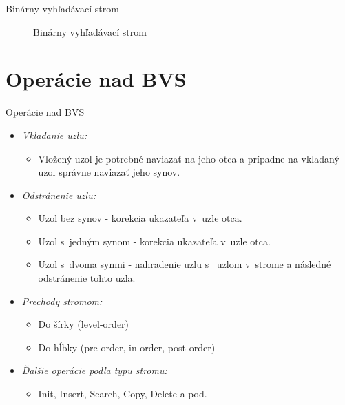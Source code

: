 \documentclass[10pt]{beamer}
\begin{document}
\begin{frame}{Binárny vyhľadávací strom}
    \begin{center}
    \begin{figure}
        \caption{Binárny vyhľadávací strom}
    \end{figure}
    \end{center}
\end{frame}

\section{Operácie nad BVS}
\begin{frame}{Operácie nad BVS}
    \begin{itemize}
        \item{\emph{Vkladanie uzlu:}}
        \begin{itemize}
            \item{Vložený uzol je potrebné naviazať na jeho otca a prípadne na vkladaný uzol správne
            naviazať jeho synov.}
            \end{itemize}
        \item{\emph{Odstránenie uzlu:}}
            \begin{itemize}
            \item{Uzol bez synov - korekcia ukazateľa v~uzle otca.}
            \item{Uzol s~jedným synom - korekcia ukazateľa v~uzle otca.}
            \item{Uzol s~dvoma synmi - nahradenie uzlu s~ uzlom v~strome a následné odstránenie tohto uzla.}
            \end{itemize}
        \item{\emph{Prechody stromom:}}
            \begin{itemize}
            \item{Do šírky (level-order)}
            \item{Do hĺbky (pre-order, in-order, post-order)}
            \end{itemize}
        \item{\emph{Ďalšie operácie podľa typu stromu:}}
            \begin{itemize}
            \item{Init, Insert, Search, Copy, Delete a pod.}
            \end{itemize}
    \end{itemize}
\end{frame}
\end{document}
